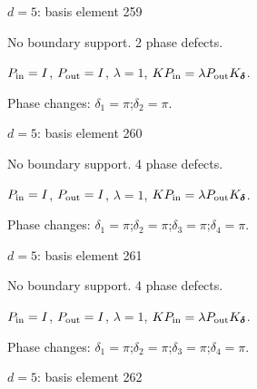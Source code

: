 {\Large $d=5$: basis element 259}\par
No boundary support. 2 phase defects.
\begin{center}
\end{center}
\vspace{-1mm}
$P_{\rm in}=I$, \quad $P_{\rm out}=I$, \quad $\lambda=1$, \qquad $K P_{\rm in}=\lambda P_{\rm out}K_{\boldsymbol\delta}$.
\par\smallskip\begin{minipage}{.98\linewidth}\small Phase changes: $\delta_{1}=\pi$;\quad $\delta_{2}=\pi$.\end{minipage}
\vfill
{\footnotesize\texttt{}}
\newpage
{}
{\Large $d=5$: basis element 260}\par
No boundary support. 4 phase defects.
\begin{center}
\end{center}
\vspace{-1mm}
$P_{\rm in}=I$, \quad $P_{\rm out}=I$, \quad $\lambda=1$, \qquad $K P_{\rm in}=\lambda P_{\rm out}K_{\boldsymbol\delta}$.
\par\smallskip\begin{minipage}{.98\linewidth}\small Phase changes: $\delta_{1}=\pi$;\quad $\delta_{2}=\pi$;\quad $\delta_{3}=\pi$;\quad $\delta_{4}=\pi$.\end{minipage}
\vfill
{\footnotesize\texttt{}}
\newpage
{}
{\Large $d=5$: basis element 261}\par
No boundary support. 4 phase defects.
\begin{center}
\end{center}
\vspace{-1mm}
$P_{\rm in}=I$, \quad $P_{\rm out}=I$, \quad $\lambda=1$, \qquad $K P_{\rm in}=\lambda P_{\rm out}K_{\boldsymbol\delta}$.
\par\smallskip\begin{minipage}{.98\linewidth}\small Phase changes: $\delta_{1}=\pi$;\quad $\delta_{2}=\pi$;\quad $\delta_{3}=\pi$;\quad $\delta_{4}=\pi$.\end{minipage}
\vfill
{\footnotesize\texttt{}}
\newpage
{}
{\Large $d=5$: basis element 262}\par
